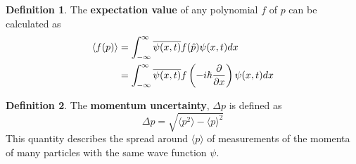 \documentclass[12pt,a4paper]{article}
\theoremstyle{definition}
\newtheorem{definition}{Definition}[subsection]
\begin{document}
\begin{definition}
	The \textbf{expectation value} of any polynomial $f$ of $p$ can be calculated as
	\[
		\begin{aligned}
			\langle f(p) \rangle
				& = \int_{-\infty}^{\infty} \overline{\psi(x, t)} f(\hat{p}) \psi(x, t) dx \\
				& = \int_{-\infty}^{\infty} \overline{\psi(x, t)} f \left( -i \hbar \diffp{}{x} \right ) \psi(x, t) dx
		\end{aligned}
	\]
\end{definition}

\begin{definition}
	The \textbf{momentum uncertainty}, $\Delta p$ is defined as
	\[
		\Delta p = \sqrt{\langle p^2 \rangle - {\langle p \rangle}^2}
	\]
	This quantity describes the spread around $\langle p \rangle$ of measurements of the momenta of many particles with the same wave function $\psi$.
\end{definition}
\end{document}
